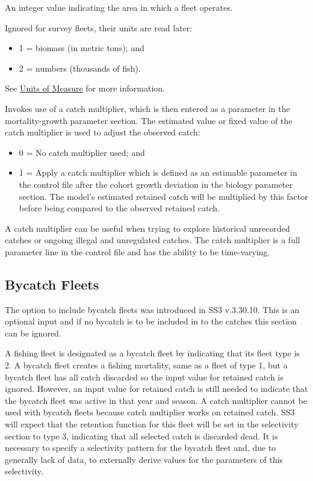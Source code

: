 An integer value indicating the area in which a fleet operates.

  Ignored for survey fleets, their units are read later:
	  \begin{itemize}
	  	\item 1 = biomass (in metric tons); and
	  	\item 2 = numbers (thousands of fish).
	  \end{itemize}   
  See \hyperlink{UnitsOfMeasure}{Units of Measure} for more information.

\hypertarget{CatchMult}{}
Invokes use of a catch multiplier, which is then entered as a parameter in the mortality-growth parameter section.  The estimated value or fixed value of the catch multiplier is used to adjust the observed catch:
	  \begin{itemize}
	  	\item 0 = No catch multiplier used; and
	  	\item 1 = Apply a catch multiplier which is defined as an estimable parameter in the control file after the cohort growth deviation in the biology parameter section. The model's estimated retained catch will be multiplied by this factor before being compared to the observed retained catch.
	  \end{itemize} 
	  
A catch multiplier can be useful when trying to explore historical unrecorded catches or ongoing illegal and unregulated catches.  The catch multiplier is a full parameter line in the control file and has the ability to be time-varying.  

\subsection{Bycatch Fleets}
The option to include bycatch fleets was introduced in SS3 v.3.30.10.  This is an optional input and if no bycatch is to be included in to the catches this section can be ignored.

A fishing fleet is designated as a bycatch fleet by indicating that its fleet type is 2.  A bycatch fleet creates a fishing mortality, same as a fleet of type 1, but a bycatch fleet has all catch discarded so the input value for retained catch is ignored.  However, an input value for retained catch is still needed to indicate that the bycatch fleet was active in that year and season.  A catch multiplier cannot be used with bycatch fleets because catch multiplier works on retained catch.  SS3 will expect that the retention function for this fleet will be set in the selectivity section to type 3, indicating that all selected catch is discarded dead.  It is necessary to specify a selectivity pattern for the bycatch fleet and, due to generally lack of data, to externally derive values for the parameters of this selectivity.

